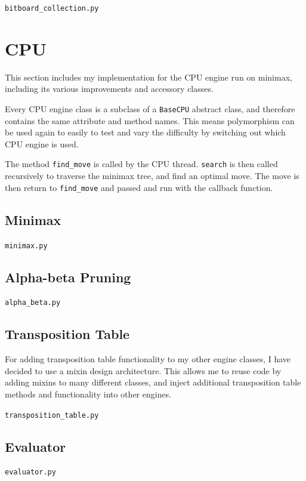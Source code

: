 \documentclass[../main/main.tex]{subfiles}
\begin{document}
\noindent\verb|bitboard_collection.py|


\section{CPU}
This section includes my implementation for the CPU engine run on minimax, including its various improvements and accessory classes.

Every CPU engine class is a subclass of a \lstinline{BaseCPU} abstract class, and therefore contains the same attribute and method names. This means polymorphism can be used again to easily to test and vary the difficulty by switching out which CPU engine is used.

The method \lstinline{find_move} is called by the CPU thread. \lstinline{search} is then called recursively to traverse the minimax tree, and find an optimal move. The move is then return to \lstinline{find_move} and passed and run with the callback function.

\subsection{Minimax}
\label{sec:minimax}
\noindent\verb|minimax.py|


\subsection{Alpha-beta Pruning}
\label{sec:alpha-beta}
\noindent\verb|alpha_beta.py|


\subsection{Transposition Table}
\label{sec:transposition-table}
For adding transposition table functionality to my other engine classes, I have decided to use a mixin design architecture. This allows me to reuse code by adding mixins to many different classes, and inject additional transposition table methods and functionality into other engines.

\noindent\verb|transposition_table.py|


\subsection{Evaluator}
\noindent\verb|evaluator.py|

\end{document}

